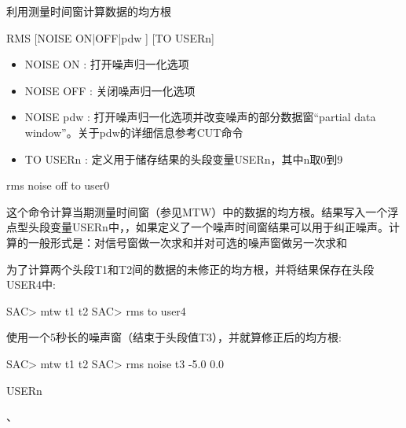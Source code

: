 \label{cmd:rms}

利用测量时间窗计算数据的均方根

\begin{SACSTX}
RMS [NOISE ON|OFF|pdw ] [TO USERn]
\end{SACSTX}

\begin{itemize}
\item NOISE ON : 打开噪声归一化选项  
\item NOISE OFF : 关闭噪声归一化选项  
\item NOISE pdw : 打开噪声归一化选项并改变噪声的部分数据窗``partial data window''。关于pdw的详细信息参考CUT命令
\item TO USERn : 定义用于储存结果的头段变量USERn，其中n取0到9 
\end{itemize}

\begin{SACDFT}
rms noise off to user0
\end{SACDFT}

这个命令计算当期测量时间窗（参见MTW）中的数据的均方根。结果写入一个浮点型头段变量USERn中，，如果定义了一个噪声时间窗结果可以用于纠正噪声。计算的一般形式是：对信号窗做一次求和并对可选的噪声窗做另一次求和

为了计算两个头段T1和T2间的数据的未修正的均方根，并将结果保存在头段USER4中:
\begin{SACCode}
SAC> mtw t1 t2
SAC> rms to user4
\end{SACCode}

使用一个5秒长的噪声窗（结束于头段值T3），并就算修正后的均方根:
\begin{SACCode}
SAC> mtw t1 t2
SAC> rms noise t3 -5.0 0.0
\end{SACCode}

USERn

、
